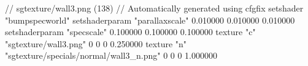 // sgtexture/wall3.png (138)
// Automatically generated using cfgfix
setshader "bumpspecworld"
setshaderparam "parallaxscale" 0.010000 0.010000 0.010000
setshaderparam "specscale" 0.100000 0.100000 0.100000
texture "c" "sgtexture/wall3.png" 0 0 0 0.250000
texture "n" "sgtexture/specials/normal/wall3_n.png" 0 0 0 1.000000
